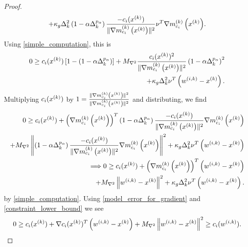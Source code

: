 \begin{proof}
\begin{align*}
+ \kappa_g \Delta_k^2 \left(1 - \alpha \Delta_k^{p_{\alpha}}\right)\frac{-c_i(x^{(k)})}{\|{\nabla m_{c_i}^{(k)}\left(x^{(k)}\right)}\|^2}\nu^T{\nabla m_{c_i}^{(k)}\left(x^{(k)}\right)}.
\end{align*}
Using \cref{simple_computation}, this is
\begin{align*}
0 \ge c_i(x^{(k)})\left[1 - \left(1 - \alpha \Delta_k^{p_{\alpha}}\right)\right] 
+ {M_{\nabla^2}} \frac {c_i(x^{(k)})^2}{\|{\nabla m_{c_i}^{(k)}\left(x^{(k)}\right)}\|^2}\left(1 - \alpha \Delta_k^{p_{\alpha}}\right)^2 \\
+ \kappa_g \Delta_k^2\nu^T \left({w^{(i, k)}} - x^{(k)}\right).
\end{align*}
Multiplying $c_i(x^{(k)})$ by $1 = \frac{\|{\nabla m_{c_i}^{(k)}\left(x^{(k)}\right)}\|^2}{\|{\nabla m_{c_i}^{(k)}\left(x^{(k)}\right)}\|^2}$ and distributing, we find
\begin{align*}
0 \ge c_i(x^{(k)}) + \left({\nabla m_{c_i}^{(k)}\left(x^{(k)}\right)}\right)^T\left(1 - \alpha \Delta_k^{p_{\alpha}}\right)\frac{-c_i(x^{(k)})}{\|{\nabla m_{c_i}^{(k)}\left(x^{(k)}\right)}\|^2}{\nabla m_{c_i}^{(k)}\left(x^{(k)}\right)}  \\
+ {M_{\nabla^2}} \left\|\left(1 - \alpha \Delta_k^{p_{\alpha}}\right)\frac{-c_i(x^{(k)})}{\|{\nabla m_{c_i}^{(k)}\left(x^{(k)}\right)}\|^2}{\nabla m_{c_i}^{(k)}\left(x^{(k)}\right)}\right\|^2
+ \kappa_g \Delta_k^2\nu^T \left({w^{(i, k)}} - x^{(k)}\right) \\
\Longrightarrow 0 \ge c_i(x^{(k)}) + \left({\nabla m_{c_i}^{(k)}\left(x^{(k)}\right)}\right)^T\left({w^{(i, k)}} - x^{(k)}\right) \\
+ {M_{\nabla^2}} \left\|{w^{(i, k)}} - x^{(k)}\right\|^2  + \kappa_g \Delta_k^2\nu^T \left({w^{(i, k)}} - x^{(k)}\right).
\end{align*}
by \cref{simple_computation}.
Using \cref{model_error_for_gradient} and \cref{constraint_lower_bound} we see
\begin{align}
0 \ge c_i(x^{(k)}) + \nabla c_i(x^{(k)})^T\left({w^{(i, k)}} - x^{(k)} \right) + {M_{\nabla^2}} \left\|{w^{(i, k)}} - x^{(k)}\right\|^2 \ge c_i({w^{(i, k)}}). \label{c_is_negative}
\end{align}


\end{proof}
